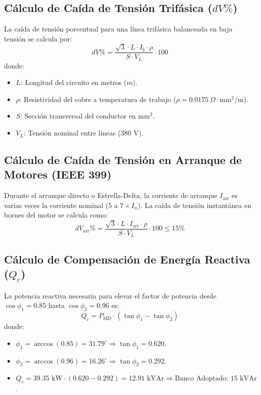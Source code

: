 \subsection{Cálculo de Caída de Tensión Trifásica ($dV\%$)}
La caída de tensión porcentual para una línea trifásica balanceada en baja tensión se calcula por:
\begin{equation}
dV\% = \frac{\sqrt{3} \cdot L \cdot I_b \cdot \rho}{S \cdot V_L} \cdot 100
\end{equation}
donde:
\begin{itemize}
    \item $L$: Longitud del circuito en metros ($m$).
    \item $\rho$: Resistividad del cobre a temperatura de trabajo ($\rho = 0.0175 \:\Omega\cdot\text{mm}^2/\text{m}$).
    \item $S$: Sección transversal del conductor en $\text{mm}^2$.
    \item $V_L$: Tensión nominal entre líneas ($380\text{ V}$).
\end{itemize}

\subsection{Cálculo de Caída de Tensión en Arranque de Motores (IEEE 399)}
Durante el arranque directo o Estrella-Delta, la corriente de arranque $I_{\text{arr}}$ es varias veces la corriente nominal ($5\text{ a } 7 \times I_n$). La caída de tensión instantánea en bornes del motor se calcula como:
\begin{equation}
dV_{\text{arr}}\% = \frac{\sqrt{3} \cdot L \cdot I_{\text{arr}} \cdot \rho}{S \cdot V_L} \cdot 100 \le 15\%
\end{equation}

\subsection{Cálculo de Compensación de Energía Reactiva ($Q_c$)}
La potencia reactiva necesaria para elevar el factor de potencia desde $\cos\phi_1 = 0.85$ hasta $\cos\phi_2 = 0.96$ es:
\begin{equation}
Q_c = P_{\text{MD}} \cdot (\tan\phi_1 - \tan\phi_2)
\end{equation}
donde:
\begin{itemize}
    \item $\phi_1 = \arccos(0.85) = 31.79^\circ \Rightarrow \tan\phi_1 = 0.620$.
    \item $\phi_2 = \arccos(0.96) = 16.26^\circ \Rightarrow \tan\phi_2 = 0.292$.
    \item $Q_c = 39.35 \text{ kW} \cdot (0.620 - 0.292) = 12.91 \text{ kVAr} \Rightarrow \text{Banco Adoptado: } 15\text{ kVAr}$.
\end{itemize}

